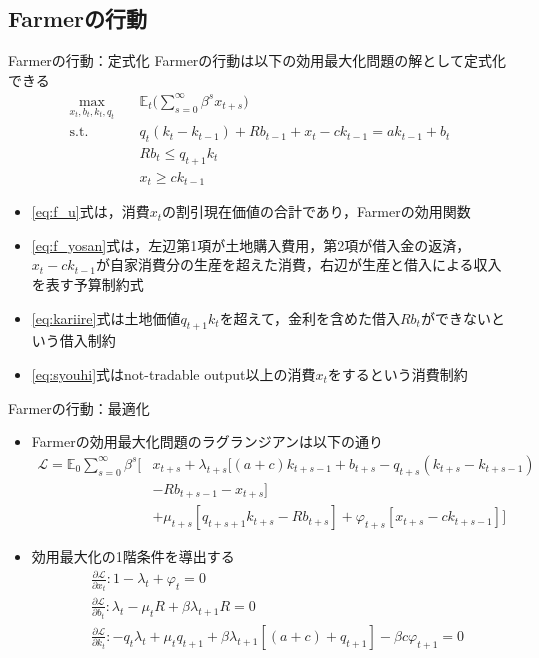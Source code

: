 \documentclass[aspectratio=169, dvipdfmx, 11pt, uplatex]{beamer}
\begin{document}
\subsection{Farmerの行動}
\begin{frame}{Farmerの行動：定式化}
  Farmerの行動は以下の効用最大化問題の解として定式化できる
  \begin{align}
    \max_{x_t, b_t, k_t, q_t} \quad & \mathbb{E}_t \bigg( \sum_{s=0}^{\infty} \beta^s x_{t+s} \bigg) \label{eq:f_u} \\
\text{s.t.} \quad & q_t(k_t - k_{t-1}) + R b_{t-1} + x_t - c k_{t-1} = a k_{t-1} + b_t \label{eq:f_yosan} \\
& R b_t \leq q_{t+1} k_t \label{eq:kariire}\\
& x_t \geq c k_{t-1} \label{eq:syouhi}
  \end{align}
  \begin{itemize}
    \item \eqref{eq:f_u}式は，消費$x_t$の割引現在価値の合計であり，Farmerの効用関数
    \item \eqref{eq:f_yosan}式は，左辺第1項が土地購入費用，第2項が借入金の返済，$x_t-ck_{t-1}$が自家消費分の生産を超えた消費，右辺が生産と借入による収入を表す予算制約式
    \item \eqref{eq:kariire}式は土地価値$q_{t+1} k_t$を超えて，金利を含めた借入$R b_t$ができないという借入制約
    \item \eqref{eq:syouhi}式はnot-tradable output以上の消費$x_t$をするという消費制約
  \end{itemize}
\end{frame}

\begin{frame}{Farmerの行動：最適化}
  \begin{itemize}
    \item Farmerの効用最大化問題のラグランジアンは以下の通り
      \begin{equation}
        \begin{aligned}
          \mathcal{L} = \mathbb{E}_0 \sum_{s=0}^{\infty} \beta^s \bigg[ & x_{t+s} + \lambda_{t+s} [(a + c) k_{t+s-1} + b_{t+s} - q_{t+s} (k_{t+s} - k_{t+s-1}) \\
          &- R b_{t+s-1} - x_{t+s}] \\
          &+\mu_{t+s}[q_{t+s+1}k_{t+s} - R b_{t+s}] + \varphi_{t+s}[x_{t+s} - ck_{t+s-1}] \bigg]
        \end{aligned}
      \end{equation}
    \item 効用最大化の1階条件を導出する
      \begin{align}
        &\frac{\partial\mathcal{L}}{\partial x_t}: 1 - \lambda_t + \varphi_t = 0 \\
        &\frac{\partial\mathcal{L}}{\partial b_t}: \lambda_t - \mu_t R + \beta \lambda_{t+1} R = 0 \\
        &\frac{\partial\mathcal{L}}{\partial k_t}: - q_t \lambda_t + \mu_t q_{t+1} + \beta \lambda_{t+1}[(a+c) + q_{t+1}] - \beta c \varphi_{t+1} = 0
      \end{align}
  \end{itemize}  
\end{frame}
\end{document}
